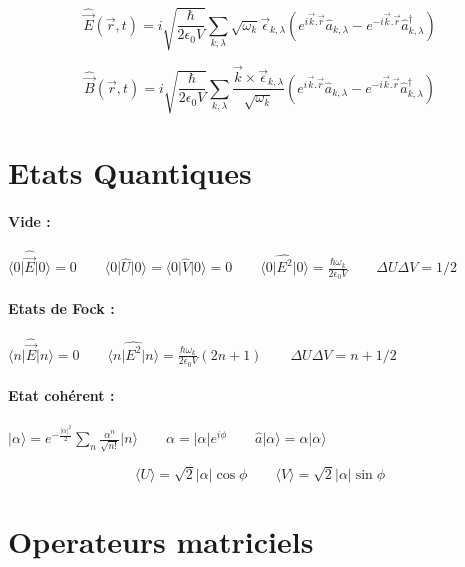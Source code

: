 \documentclass{article}
\begin{document}
$$\hat{\vec{E}}(\vec{r},t)=i\sqrt{\frac{\hbar}{2\epsilon_0V}}\sum_{k,\lambda}
\sqrt{\omega_k}\vec{\epsilon}_{k,\lambda}\left(e^{i\vec{k}.\vec{r}}\hat{a}_{k,\lambda}-e^{-i\vec{k}.\vec{r}}\hat{a}^{\dagger}_{k,\lambda}\right)$$

$$\hat{\vec{B}}(\vec{r},t)=i\sqrt{\frac{\hbar}{2\epsilon_0V}}\sum_{k,\lambda}\frac{\vec{k}\times\vec{\epsilon}_{k,\lambda}}{\sqrt{\omega_k}}\left(e^{i\vec{k}.\vec{r}}\hat{a}_{k,\lambda}-e^{-i\vec{k}.\vec{r}}\hat{a}^{\dagger}_{k,\lambda}\right)$$

\section{Etats Quantiques}

\paragraph{Vide :} $\langle0\vert\hat{\vec{E}}\vert0\rangle =0 \qquad \langle0\vert\hat{U}\vert0\rangle =\langle0\vert\hat{V}\vert0\rangle =0 \qquad \langle0\vert\hat{E^2}\vert0\rangle =\frac{\hbar\omega_k}{2\epsilon_0V} \qquad \Delta U \Delta V = 1/2$

\paragraph{Etats de Fock :} $\langle n\vert\hat{\vec{E}}\vert n\rangle =0 \qquad \langle n\vert\hat{E^2}\vert n\rangle =\frac{\hbar\omega_k}{2\epsilon_0V} (2n+1) \qquad \Delta U \Delta V = n +1/2$

\paragraph{Etat cohérent :} $\vert \alpha \rangle = e^{-\frac{\vert\alpha\vert^2}{2}}\sum_n \frac{\alpha^n}{\sqrt{n!}}\vert n \rangle \qquad \alpha = \vert\alpha\vert e^{i\phi} \qquad \hat{a}\vert\alpha\rangle = \alpha\vert\alpha\rangle$

$$\langle U\rangle = \sqrt{2}\vert\alpha\vert\cos\phi \qquad \langle V\rangle = \sqrt{2}\vert\alpha\vert\sin\phi$$

\section{Operateurs matriciels}
\end{document}
